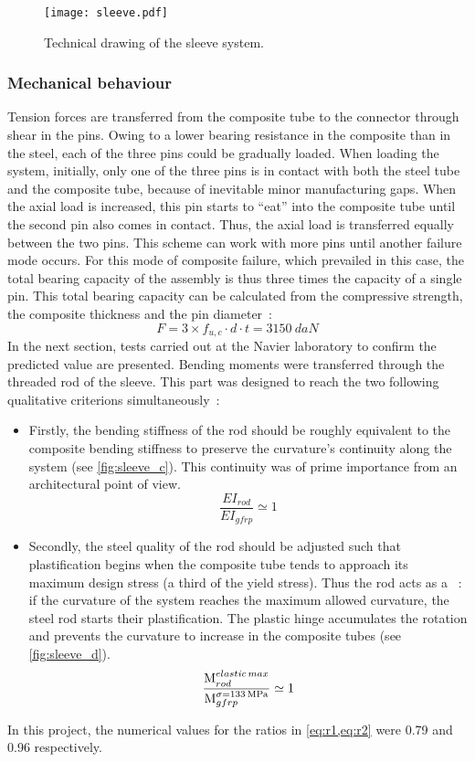 \begin{figure}[ht]
	\centering
	\texttt{[image: sleeve.pdf]}
	\caption{Technical drawing of the sleeve system.}
	\label{fig:sleeve_dwg}
\end{figure}

\subsubsection{Mechanical behaviour}
Tension forces are transferred from the composite tube to the connector through shear in the pins. Owing to a lower bearing resistance in the composite than in the steel, each of the three pins could be gradually loaded. When loading the system, initially, only one of the three pins is in contact with both the steel tube and the composite tube, because of inevitable minor manufacturing gaps. When the axial load is increased, this pin starts to “eat” into the composite tube until the second pin also comes in contact. Thus, the axial load is transferred equally between the two pins. This scheme can work with more pins until another failure mode occurs.
For this mode of composite failure, which prevailed in this case, the total bearing capacity of the assembly is thus three times the capacity of a single pin. This total bearing capacity can be calculated from the compressive strength, the composite thickness and the pin diameter~:
\begin{equation}
	F = 3 \times f_{u,c}\cdot d \cdot t = \SI{3150}{daN}
\end{equation}
In the next section, tests carried out at the Navier laboratory to confirm the predicted value are presented.
Bending moments were transferred through the threaded rod of the sleeve. This part was designed to reach the two following qualitative criterions simultaneously~:
\begin{itemize}
\item
Firstly, the bending stiffness of the rod should be roughly equivalent to the composite bending stiffness to preserve the curvature’s continuity along the system  (see \cref{fig:sleeve_c}). This continuity was of prime importance from an architectural point of view.
\begin{equation}
	\frac{EI_{rod}}{EI_{gfrp}} \simeq 1
	\label{eq:r1}
\end{equation}
\item
Secondly, the steel quality of the rod should be adjusted such that plastification begins when the composite tube tends to approach its maximum design stress (a third of the yield stress). Thus the rod acts as a ~: if the curvature of the system reaches the maximum allowed curvature, the steel rod starts their plastification. The plastic hinge accumulates the rotation and prevents the curvature to increase in the composite tubes (see \cref{fig:sleeve_d}).
\begin{equation}
	\frac{\raisebox{0.2ex}M^{elastic\,max}_{rod}}{\raisebox{-0.2ex}M^{\sigma = \SI{133}{MPa}}_{gfrp}} \simeq 1
	\label{eq:r2}
\end{equation}
\end{itemize}
In this project, the numerical values for the ratios in \cref{eq:r1,eq:r2} were 0.79 and 0.96 respectively.

